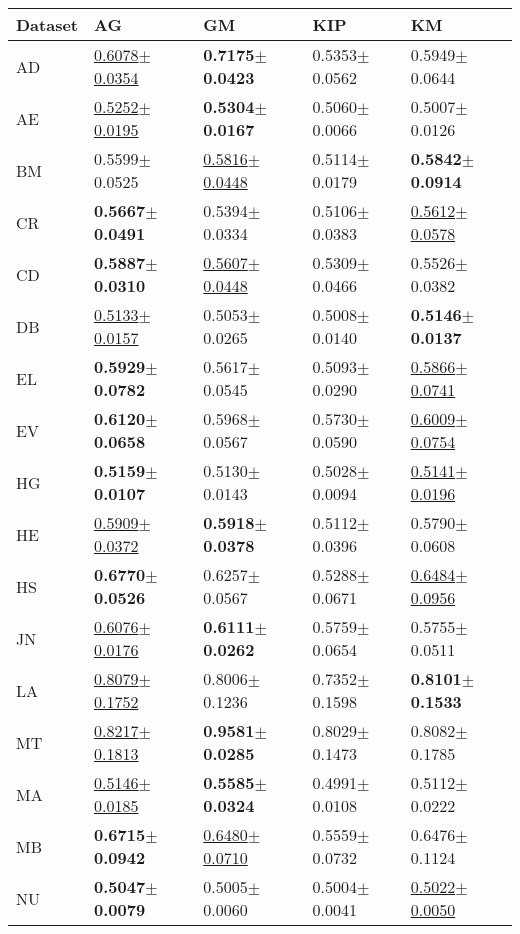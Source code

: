 \begin{tabular}{lllll}
\toprule
Dataset & AG & GM & KIP & KM \\
\midrule
AD & \underline{0.6078$\pm$0.0354} & \textbf{0.7175$\pm$0.0423} & 0.5353$\pm$0.0562 & 0.5949$\pm$0.0644 \\
AE & \underline{0.5252$\pm$0.0195} & \textbf{0.5304$\pm$0.0167} & 0.5060$\pm$0.0066 & 0.5007$\pm$0.0126 \\
BM & 0.5599$\pm$0.0525 & \underline{0.5816$\pm$0.0448} & 0.5114$\pm$0.0179 & \textbf{0.5842$\pm$0.0914} \\
CR & \textbf{0.5667$\pm$0.0491} & 0.5394$\pm$0.0334 & 0.5106$\pm$0.0383 & \underline{0.5612$\pm$0.0578} \\
CD & \textbf{0.5887$\pm$0.0310} & \underline{0.5607$\pm$0.0448} & 0.5309$\pm$0.0466 & 0.5526$\pm$0.0382 \\
DB & \underline{0.5133$\pm$0.0157} & 0.5053$\pm$0.0265 & 0.5008$\pm$0.0140 & \textbf{0.5146$\pm$0.0137} \\
EL & \textbf{0.5929$\pm$0.0782} & 0.5617$\pm$0.0545 & 0.5093$\pm$0.0290 & \underline{0.5866$\pm$0.0741} \\
EV & \textbf{0.6120$\pm$0.0658} & 0.5968$\pm$0.0567 & 0.5730$\pm$0.0590 & \underline{0.6009$\pm$0.0754} \\
HG & \textbf{0.5159$\pm$0.0107} & 0.5130$\pm$0.0143 & 0.5028$\pm$0.0094 & \underline{0.5141$\pm$0.0196} \\
HE & \underline{0.5909$\pm$0.0372} & \textbf{0.5918$\pm$0.0378} & 0.5112$\pm$0.0396 & 0.5790$\pm$0.0608 \\
HS & \textbf{0.6770$\pm$0.0526} & 0.6257$\pm$0.0567 & 0.5288$\pm$0.0671 & \underline{0.6484$\pm$0.0956} \\
JN & \underline{0.6076$\pm$0.0176} & \textbf{0.6111$\pm$0.0262} & 0.5759$\pm$0.0654 & 0.5755$\pm$0.0511 \\
LA & \underline{0.8079$\pm$0.1752} & 0.8006$\pm$0.1236 & 0.7352$\pm$0.1598 & \textbf{0.8101$\pm$0.1533} \\
MT & \underline{0.8217$\pm$0.1813} & \textbf{0.9581$\pm$0.0285} & 0.8029$\pm$0.1473 & 0.8082$\pm$0.1785 \\
MA & \underline{0.5146$\pm$0.0185} & \textbf{0.5585$\pm$0.0324} & 0.4991$\pm$0.0108 & 0.5112$\pm$0.0222 \\
MB & \textbf{0.6715$\pm$0.0942} & \underline{0.6480$\pm$0.0710} & 0.5559$\pm$0.0732 & 0.6476$\pm$0.1124 \\
NU & \textbf{0.5047$\pm$0.0079} & 0.5005$\pm$0.0060 & 0.5004$\pm$0.0041 & \underline{0.5022$\pm$0.0050} \\

\end{tabular}
